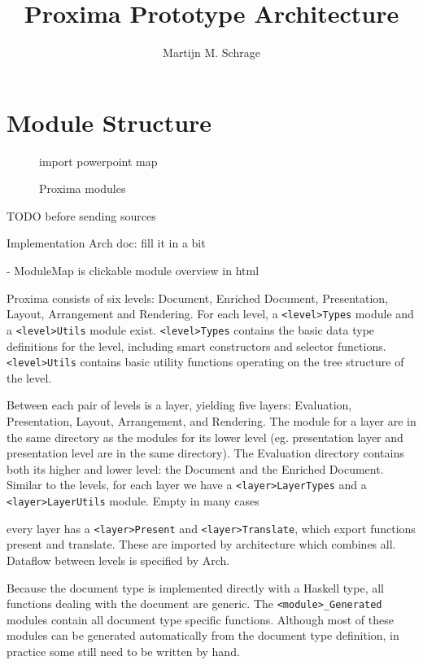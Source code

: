 \documentclass[]{article}
\begin{document}
\title{Proxima Prototype Architecture}
\author{Martijn M. Schrage}
\maketitle

\section{Module Structure}
\begin{figure}
\begin{tiny}
\begin{center}
\begin{center}
import powerpoint map
\end{center}\caption{Proxima modules}
\end{center}
\end{tiny}
\end{figure}

TODO before sending sources

Implementation
Arch doc:
fill it in a bit


- ModuleMap is clickable module overview in html

Proxima consists of six levels: Document, Enriched Document, Presentation, Layout, Arrangement and Rendering. For each level, a \verb|<level>Types| module and a \verb|<level>Utils| module exist. \verb|<level>Types| contains the basic data type definitions for the level, including smart constructors and selector functions. \verb|<level>Utils| contains basic utility functions operating on the tree structure of the level.

Between each pair of levels is a layer, yielding five layers: Evaluation, Presentation, Layout, Arrangement, and Rendering. The module for a layer are in the same directory as the modules for its lower level (eg. presentation layer and presentation level are in the same directory). The Evaluation directory contains both its higher and lower level: the Document and the Enriched Document. Similar to the levels, for each layer we have a \verb|<layer>LayerTypes| and a \verb|<layer>LayerUtils| module. Empty in many cases

every layer has a \verb|<layer>Present| and \verb|<layer>Translate|, which export functions present and translate. These are imported by architecture which combines all. Dataflow between levels is specified by Arch.

Because the document type is implemented directly with a Haskell type, all functions dealing with the document are generic. The \verb|<module>_Generated| modules contain all document type specific functions. Although most of these modules can be generated automatically from the document type definition, in practice some still need to be written by hand.
\end{document}
